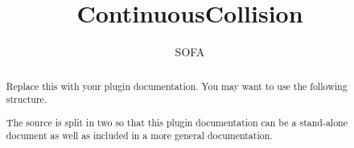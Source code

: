 \documentclass{article}
\begin{document}
\raggedright

\title{ContinuousCollision}
\author{SOFA}

\maketitle

\begin{abstract}
Replace this with your plugin documentation. You may want to use the following structure.

The source is split in two so that this plugin documentation can be a stand-alone document as well as included in a more general documentation.
\end{abstract}


\end{document}
